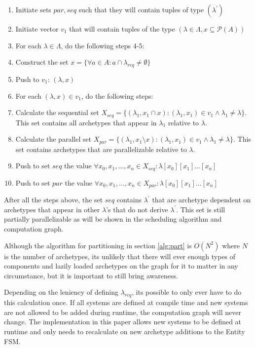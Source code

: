 \begin{enumerate}
    \item Initiate sets $par, seq$ such that they will contain tuples of type $(\lambda^\prime)$
    \item Initiate vector $v_1$ that will contain tuples of the type $(\lambda \in \Lambda, x \subseteq \mathcal{P}(A))$
    \item For each $\lambda \in \Lambda$, do the following steps 4-5:
    \item Construct the set $x = \{ \forall a \in A : a \cap \lambda_{req} \not= \emptyset \}$
    \item Push to $v_1$: $(\lambda, x)$
    \item For each $(\lambda, x) \in v_1$, do the following steps:
    \item Calculate the sequential set $X_{seq} = \{ (\lambda_1, x_1 \cap x ) : (\lambda_1, x_1) \in v_1 \land \lambda_1 \not= \lambda \}$. This set contains all archetypes that appear in $\lambda_1$ relative to $\lambda$.
    \item Calculate the parallel set $X_{par} = \{ (\lambda_1, x_1 \setminus x ) : (\lambda_1, x_1) \in v_1 \land \lambda_1 \not= \lambda \}$. This set contains archetypes that are parallelizable relative to $\lambda$.
    \item Push to set $seq$ the value $ \forall x_0,x_1,\ldots,x_n \in X_{seq} : \lambda[x_0][x_1]\ldots[x_n]$
    \item Push to set $par$ the value $ \forall x_0,x_1,\ldots,x_n \in X_{par} : \lambda[x_0][x_1]\ldots[x_n]$
\end{enumerate}

After all the steps above, the set $seq$ contains $\lambda^\prime$ that are archetype dependent on archetypes that appear in other $\lambda$'s that do not derive $\lambda^\prime$. This set is still partially parallelizable as will be shown in the scheduling algorithm and computation graph.

Although the algorithm for partitioning in section \ref{alg:part} is $O(N^2)$ where $N$ is the number of archetypes, its unlikely that there will ever enough types of components and lazily loaded archetypes on the graph for it to matter in any circumstance, but it is important to still bring awareness.

Depending on the leniency of defining $\lambda_{req}$, its possible to only ever have to do this calculation once. If all systems are defined at compile time and new systems are not allowed to be added during runtime, the computation graph will never change. The implementation in this paper allows new systems to be defined at runtime and only needs to recalculate on new archetype additions to the Entity FSM.

